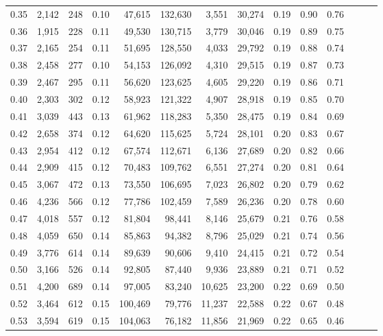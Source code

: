 \begin{tabular}{rrrrrrrrrrrrrr}
0.35 &  2,142 &  248 &  0.10 &   47,615 &  132,630 &   3,551 &  30,274 &  0.19 &  0.90 &      0.76 \\
0.36 &  1,915 &  228 &  0.11 &   49,530 &  130,715 &   3,779 &  30,046 &  0.19 &  0.89 &      0.75 \\
0.37 &  2,165 &  254 &  0.11 &   51,695 &  128,550 &   4,033 &  29,792 &  0.19 &  0.88 &      0.74 \\
0.38 &  2,458 &  277 &  0.10 &   54,153 &  126,092 &   4,310 &  29,515 &  0.19 &  0.87 &      0.73 \\
0.39 &  2,467 &  295 &  0.11 &   56,620 &  123,625 &   4,605 &  29,220 &  0.19 &  0.86 &      0.71 \\
0.40 &  2,303 &  302 &  0.12 &   58,923 &  121,322 &   4,907 &  28,918 &  0.19 &  0.85 &      0.70 \\
0.41 &  3,039 &  443 &  0.13 &   61,962 &  118,283 &   5,350 &  28,475 &  0.19 &  0.84 &      0.69 \\
0.42 &  2,658 &  374 &  0.12 &   64,620 &  115,625 &   5,724 &  28,101 &  0.20 &  0.83 &      0.67 \\
0.43 &  2,954 &  412 &  0.12 &   67,574 &  112,671 &   6,136 &  27,689 &  0.20 &  0.82 &      0.66 \\
0.44 &  2,909 &  415 &  0.12 &   70,483 &  109,762 &   6,551 &  27,274 &  0.20 &  0.81 &      0.64 \\
0.45 &  3,067 &  472 &  0.13 &   73,550 &  106,695 &   7,023 &  26,802 &  0.20 &  0.79 &      0.62 \\
0.46 &  4,236 &  566 &  0.12 &   77,786 &  102,459 &   7,589 &  26,236 &  0.20 &  0.78 &      0.60 \\
0.47 &  4,018 &  557 &  0.12 &   81,804 &   98,441 &   8,146 &  25,679 &  0.21 &  0.76 &      0.58 \\
0.48 &  4,059 &  650 &  0.14 &   85,863 &   94,382 &   8,796 &  25,029 &  0.21 &  0.74 &      0.56 \\
0.49 &  3,776 &  614 &  0.14 &   89,639 &   90,606 &   9,410 &  24,415 &  0.21 &  0.72 &      0.54 \\
0.50 &  3,166 &  526 &  0.14 &   92,805 &   87,440 &   9,936 &  23,889 &  0.21 &  0.71 &      0.52 \\
0.51 &  4,200 &  689 &  0.14 &   97,005 &   83,240 &  10,625 &  23,200 &  0.22 &  0.69 &      0.50 \\
0.52 &  3,464 &  612 &  0.15 &  100,469 &   79,776 &  11,237 &  22,588 &  0.22 &  0.67 &      0.48 \\
0.53 &  3,594 &  619 &  0.15 &  104,063 &   76,182 &  11,856 &  21,969 &  0.22 &  0.65 &      0.46 \\

\end{tabular}
